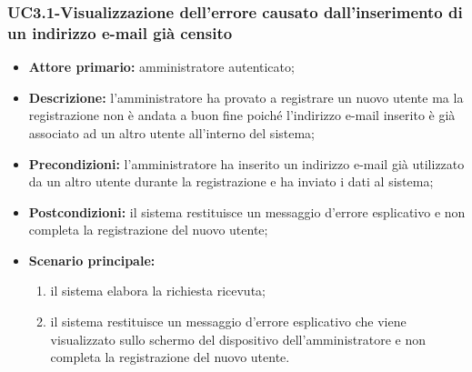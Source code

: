 \subsubsection{UC3.1-Visualizzazione dell'errore causato dall'inserimento di un indirizzo e-mail già censito}
\begin{itemize}
	\item \textbf{Attore primario:} amministratore autenticato;

	\item \textbf{Descrizione:} l'amministratore ha provato a registrare un nuovo utente ma la registrazione non è andata a buon fine poiché l'indirizzo e-mail inserito è già associato ad un altro utente all'interno del sistema;

	\item \textbf{Precondizioni:} l'amministratore ha inserito un indirizzo e-mail già utilizzato da un altro utente durante la registrazione e ha inviato i dati al sistema;

	\item \textbf{Postcondizioni:} il sistema restituisce un messaggio d'errore esplicativo e non completa la registrazione del nuovo utente;

	\item \textbf{Scenario principale:}
	\begin{enumerate}
   		\item il sistema elabora la richiesta ricevuta;
    	\item il sistema restituisce un messaggio d'errore esplicativo che viene visualizzato sullo schermo del dispositivo dell'amministratore e non completa la registrazione del nuovo utente.
	\end{enumerate}
\end{itemize}
